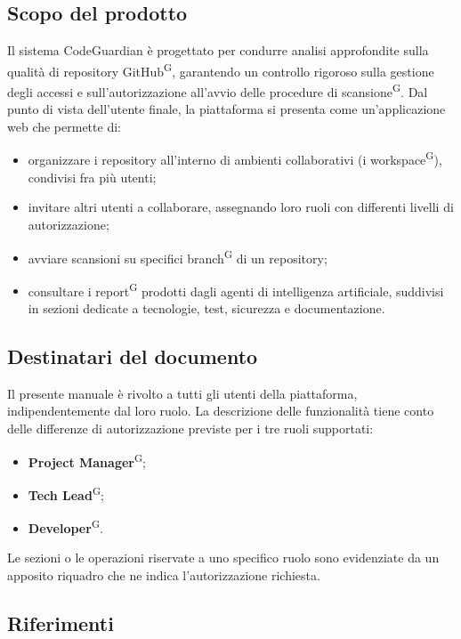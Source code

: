 \documentclass[a4paper, 11pt]{article}
\begin{document}
\subsection{Scopo del prodotto}
Il sistema CodeGuardian è progettato per condurre analisi approfondite sulla qualità di repository GitHub\textsuperscript{G}, garantendo un controllo rigoroso sulla gestione degli accessi e sull'autorizzazione all'avvio delle procedure di scansione\textsuperscript{G}. Dal punto di vista dell'utente finale, la piattaforma si presenta come un'applicazione web che permette di:
\begin{itemize}
    \item organizzare i repository all'interno di ambienti collaborativi (i workspace\textsuperscript{G}), condivisi fra più utenti;
    \item invitare altri utenti a collaborare, assegnando loro ruoli con differenti livelli di autorizzazione;
    \item avviare scansioni su specifici branch\textsuperscript{G} di un repository;
    \item consultare i report\textsuperscript{G} prodotti dagli agenti di intelligenza artificiale, suddivisi in sezioni dedicate a tecnologie, test, sicurezza e documentazione.
\end{itemize}

\subsection{Destinatari del documento}
Il presente manuale è rivolto a tutti gli utenti della piattaforma, indipendentemente dal loro ruolo. La descrizione delle funzionalità tiene conto delle differenze di autorizzazione previste per i tre ruoli supportati:
\begin{itemize}
    \item \textbf{Project Manager}\textsuperscript{G};
    \item \textbf{Tech Lead}\textsuperscript{G};
    \item \textbf{Developer}\textsuperscript{G}.
\end{itemize}
Le sezioni o le operazioni riservate a uno specifico ruolo sono evidenziate da un apposito riquadro che ne indica l'autorizzazione richiesta.

\subsection{Riferimenti}
\end{document}
